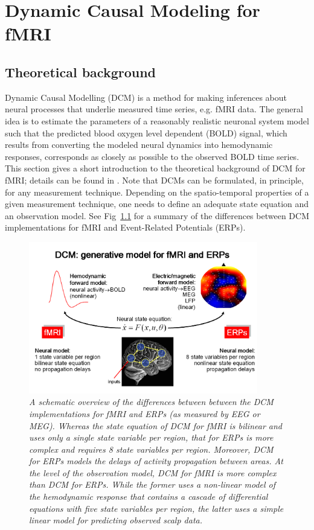 \chapter{Dynamic Causal Modeling for fMRI \label{Chap:DCM_fmri}}


\section{Theoretical background}
Dynamic Causal Modelling (DCM) is a method for making inferences about neural processes that underlie measured time series, e.g. fMRI data.  The general idea is to estimate the parameters of a reasonably realistic neuronal system model such that the predicted blood oxygen level dependent (BOLD) signal, which results from converting the modeled neural dynamics into hemodynamic responses, corresponds as closely as possible to the observed BOLD time series.  This section gives a short introduction to the theoretical background of DCM for fMRI; details can be found in \cite{dcm}.  Note that DCMs can be formulated, in principle, for any measurement technique.  Depending on the spatio-temporal properties of a given measurement technique, one needs to define an adequate state equation and an observation model. See Fig~\ref{fig1} for a summary of the differences between DCM implementations for fMRI and Event-Related Potentials (ERPs).

\begin{figure}[ht]
\begin{center}
\includegraphics[width=100mm]{dcm/Fig1}
\caption{\em A schematic overview of the differences between between the DCM implementations for fMRI and ERPs (as measured by EEG or MEG).  Whereas the state equation of DCM for fMRI is bilinear and uses only a single state variable per region, that for ERPs is more complex and requires 8 state variables per region.  Moreover, DCM for ERPs models the delays of activity propagation between areas.  At the level of the observation model, DCM for fMRI is more complex than DCM for ERPs.  While the former uses a non-linear model of the hemodynamic response that contains a cascade of differential equations with five state variables per region, the latter uses a simple linear model for predicting observed scalp data.\label{fig1}}
\end{center}
\end{figure}

